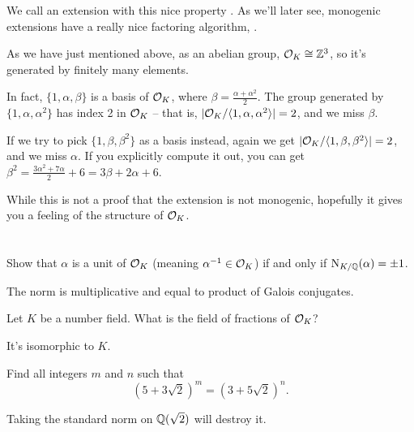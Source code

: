 We call an extension with this nice property .
As we'll later see, monogenic extensions have a really nice factoring algorithm,
.

\begin{remark}
	As we have just mentioned above, as an abelian group, $\mathcal O_K \cong \mathbb Z^3$,
	so it's generated by finitely many elements.

	In fact, $\{ 1, \alpha, \beta \}$ is a basis of $\mathcal O_K$,
	where $\beta=\frac{\alpha+\alpha^2}{2}$.
	The group generated by $\{ 1, \alpha, \alpha^2 \}$ has index 2 in $\mathcal O_K$ --
	that is, $|\mathcal O_K/\langle 1, \alpha, \alpha^2\rangle|=2$, and we miss
	$\beta$.

	If we try to pick $\{ 1, \beta, \beta^2 \}$ as a basis instead, again we
	get $|\mathcal O_K/\langle 1, \beta, \beta^2\rangle|=2$, and we miss $\alpha$.
	If you explicitly compute it out, you can get
	$\beta^2 = \frac{3\alpha^2 + 7\alpha}{2} + 6 = 3 \beta+2 \alpha+6$.

	While this is not a proof that the extension is not monogenic, hopefully it
	gives you a feeling of the structure of $\mathcal O_K$.

\end{remark}

\section{\problemhead}

\begin{sproblem} %
	\label{prob:OK_unit_norm}
	Show that $\alpha$ is a unit of $\mathcal O_K$ (meaning $\alpha^{-1} \in \mathcal O_K$)
	if and only if $\operatorname{N}_{K/\mathbb Q}(\alpha) = \pm 1$.
	\begin{hint}
		The norm is multiplicative and equal to product of Galois conjugates.
	\end{hint}
\end{sproblem}

\begin{sproblem}
	Let $K$ be a number field.
	What is the field of fractions of $\mathcal O_K$?
	\begin{hint}
		It's isomorphic to $K$.
	\end{hint}
\end{sproblem}

\begin{problem}
	Find all integers $m$ and $n$ such that
	\[ \left( 5+3\sqrt2 \right)^m = \left( 3+5\sqrt2 \right)^n. \]
	\begin{hint}
		Taking the standard norm on $\mathbb Q(\sqrt2)$ will destroy it.
	\end{hint}
\end{problem}



